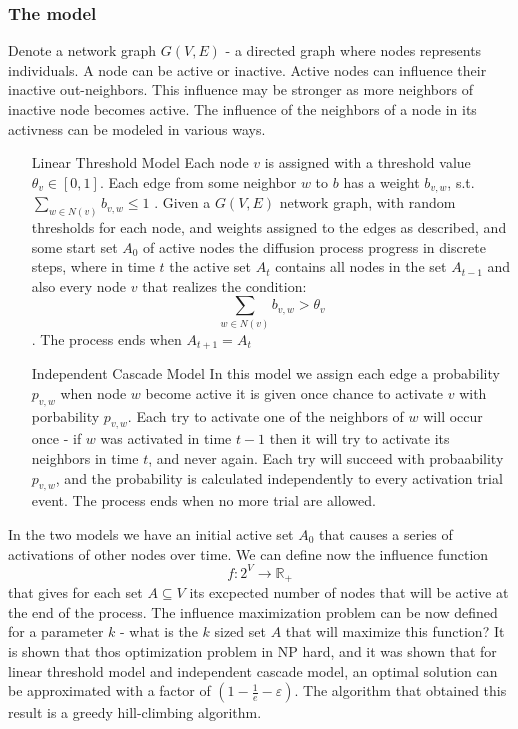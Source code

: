 \subsubsection{The model}
Denote a network graph $G(V,E)$ - a directed graph where nodes represents individuals. A node can be active or inactive. Active nodes can influence their inactive out-neighbors. This influence may be stronger as more neighbors of inactive node becomes active. The influence of the neighbors of a node in its activness can be modeled in various ways.
\begin{enumerate}
\item [Linear Threshold Model] 
Each node $v$ is assigned with a threshold value $\theta_v\in[0,1]$. Each edge from some neighbor $w$ to $b$ has a weight $b_{v,w}$, s.t. 
$\sum\limits_{w\in N(v)}{b_{v,w}}\le 1$ . Given a $G(V,E)$ network graph, with random thresholds for each node, and weights assigned to the edges as described, and some start set $A_0$ of active nodes the diffusion process progress in discrete steps, where in time $t$ the active set $A_t$ contains all nodes in the set $A_{t-1}$ and also every node $v$ that realizes the condition: $$\sum\limits_{w\in N(v)}{b_{v,w}}>\theta_v$$. The process ends when $A_{t+1}=A_t$


\item [Independent Cascade Model]
In this model we assign each edge a probability $p_{v,w}$ when node $w$ become active it is given once chance to activate $v$ with porbability $p_{v,w}$. Each try to activate one of the neighbors of $w$ will occur once - if $w$ was activated in time $t-1$ then it will try to activate its neighbors in time $t$, and never again. Each try will succeed with probaability $p_{v,w}$, and the probability is calculated independently to every activation trial event. The process ends when no more trial are allowed.
\end{enumerate}
In the two models we have an initial active set $A_0$ that causes a series of activations of other nodes over time. We can define now the influence function $$f:2^V\rightarrow \mathbb{R}_+$$ that gives for each set $A\subseteq V$ its excpected number of nodes that will be active at the end of the process. The influence maximization problem can be now defined for a parameter $k$ - what is the $k$ sized set $A$ that will maximize this function?	
It is shown \cite{kempe2003maximizing} that thos optimization problem in NP hard, and it was shown that for linear threshold model and independent cascade model, an optimal solution can be approximated with a factor of $(1-\frac{1}{e}-\varepsilon)$. The algorithm that obtained this result is a greedy hill-climbing algorithm. 


